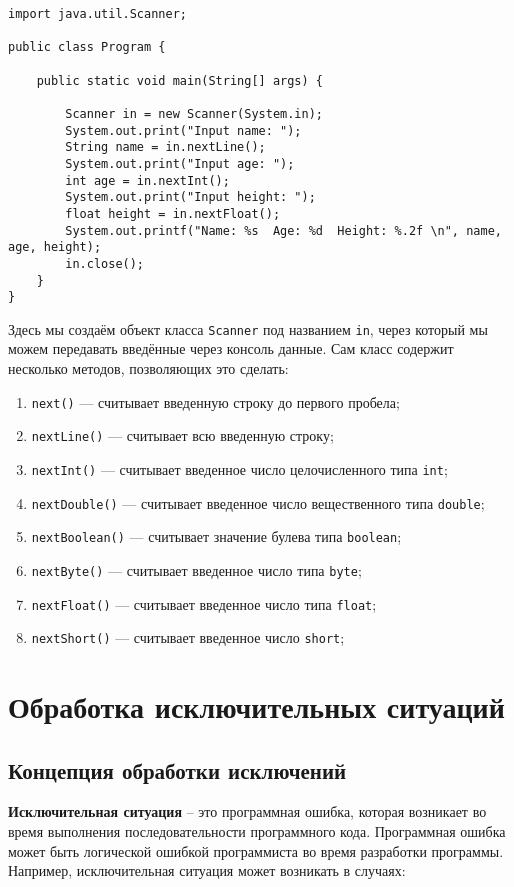 \begin{lstlisting}
import java.util.Scanner;
 
public class Program {
   
    public static void main(String[] args) {
           
        Scanner in = new Scanner(System.in);
        System.out.print("Input name: ");
        String name = in.nextLine();
        System.out.print("Input age: ");
        int age = in.nextInt();
        System.out.print("Input height: ");
        float height = in.nextFloat();
        System.out.printf("Name: %s  Age: %d  Height: %.2f \n", name, age, height);
        in.close();
    }
}
\end{lstlisting}

Здесь мы создаём объект класса \verb|Scanner| под названием \verb|in|, через который мы можем передавать введённые через консоль данные. Сам класс содержит несколько методов, позволяющих это сделать:

\begin{enumerate}
    \item \verb|next()| — считывает введенную строку до первого пробела;
    \item \verb|nextLine()| — считывает всю введенную строку;
    \item \verb|nextInt()| — считывает введенное число целочисленного типа \verb|int|;
    \item \verb|nextDouble()| — считывает введенное число вещественного типа \verb|double|;
    \item \verb|nextBoolean()| — считывает значение булева типа \verb|boolean|;
    \item \verb|nextByte()| — считывает введенное число типа \verb|byte|;
    \item \verb|nextFloat()| — считывает введенное число типа \verb|float|;
    \item \verb|nextShort()| — считывает введенное число \verb|short|;
\end{enumerate}

\chapter{Обработка исключительных ситуаций}

\section{Концепция обработки исключений}

\textbf{Исключительная ситуация} – это программная ошибка, которая возникает во время выполнения последовательности программного кода. Программная ошибка может быть логической ошибкой программиста во время разработки программы. Например, исключительная ситуация может возникать в случаях:

